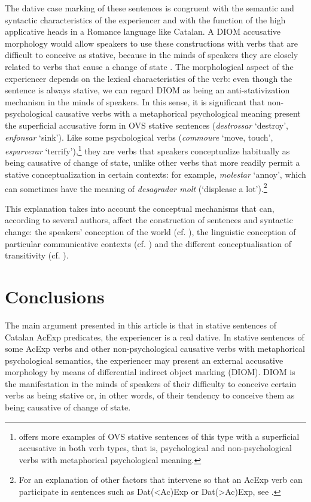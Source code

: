 \documentclass[output=paper,colorlinks,citecolor=brown,modfonts,nonflat]{langsci/langscibook}
\begin{document}
{{The dative case marking of these sentences is congruent with the semantic and syntactic characteristics of the experiencer and with the function of the high applicative heads in a Romance language like Catalan. A DIOM accusative morphology would allow speakers to use these constructions with verbs that are difficult to conceive as stative, because in the minds of speakers they are closely related to verbs that cause a change of state . The morphological aspect of the experiencer depends on the lexical characteristics of the verb: even though the sentence is always stative, we can regard DIOM as being an anti-stativization mechanism in the minds of speakers. In this sense, it is significant that non-psychological causative verbs with a metaphorical psychological meaning present the superficial accusative form in OVS stative sentences (\textit{destrossar} ‘destroy’, \textit{enfonsar} ‘sink’). Like some psychological verbs (\textit{commoure} ‘move, touch’, \textit{esparverar} ‘terrify’),\footnote{\citet[14, 29--30]{Ginebra2003} offers more examples of OVS stative sentences of this type with a superficial accusative in both verb types, that is, psychological and non-psychological verbs with metaphorical psychological meaning.} they are verbs that speakers conceptualize habitually as being causative of change of state, unlike other verbs that more readily permit a stative conceptualization in certain contexts: for example, \textit{molestar} ‘annoy’, which can sometimes have the meaning of \textit{desagradar molt} (‘displease a lot').\footnote{For an explanation of other factors that intervene so that an AcExp verb can participate in sentences such as Dat(<Ac)Exp or Dat(>Ac)Exp, see \citet[Section 5]{Royo2017}.}

This explanation takes into account the conceptual mechanisms that can, according to several authors, affect the construction of sentences and syntactic change: the speakers’ conception of the world (cf. \citealt{Ramos2002}), the linguistic conception of particular communicative contexts (cf. \citealt{Rossello2008}) and the different conceptualisation of transitivity (cf. \citealt{Ynglès2011, Pineda2012}).

\section{Conclusions}\label{sec:royo:6}

The main argument presented in this article is that in stative sentences of Catalan AcExp predicates, the experiencer is a real dative. In stative sentences of some AcExp verbs and other non-psychological causative verbs with metaphorical psychological semantics, the experiencer may present an external accusative morphology by means of differential indirect object marking (DIOM). DIOM is the manifestation in the minds of speakers of their difficulty to conceive certain verbs as being stative or, in other words, of their tendency to conceive them as being causative of change of state.

}}
\end{document}

